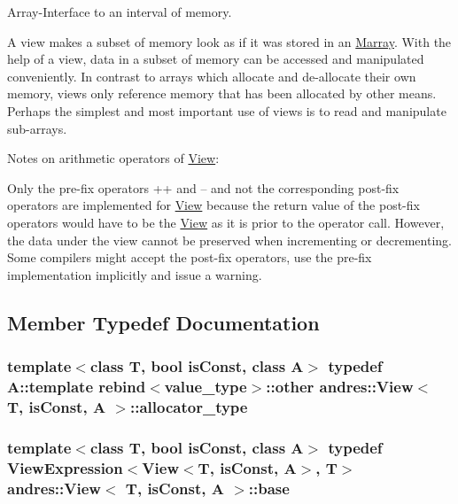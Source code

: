 Array-\/\+Interface to an interval of memory.

A view makes a subset of memory look as if it was stored in an \hyperlink{classandres_1_1Marray}{Marray}. With the help of a view, data in a subset of memory can be accessed and manipulated conveniently. In contrast to arrays which allocate and de-\/allocate their own memory, views only reference memory that has been allocated by other means. Perhaps the simplest and most important use of views is to read and manipulate sub-\/arrays.

Notes on arithmetic operators of \hyperlink{classandres_1_1View}{View}\+:
\begin{DoxyItemize}
\item Only the pre-\/fix operators ++ and -- and not the corresponding post-\/fix operators are implemented for \hyperlink{classandres_1_1View}{View} because the return value of the post-\/fix operators would have to be the \hyperlink{classandres_1_1View}{View} as it is prior to the operator call. However, the data under the view cannot be preserved when incrementing or decrementing. Some compilers might accept the post-\/fix operators, use the pre-\/fix implementation implicitly and issue a warning. 
\end{DoxyItemize}

\subsection{Member Typedef Documentation}
\hypertarget{classandres_1_1View_a175e5862a7133a937e7901e5894c2e10}{}
\subsubsection[{allocator\+\_\+type}]{\setlength{\rightskip}{0pt plus 5cm}template$<$class T, bool is\+Const, class A$>$ typedef A\+::template rebind$<${\bf value\+\_\+type}$>$\+::other {\bf andres\+::\+View}$<$ T, is\+Const, A $>$\+::{\bf allocator\+\_\+type}}\label{classandres_1_1View_a175e5862a7133a937e7901e5894c2e10}
\hypertarget{classandres_1_1View_ac9b2563b59f4fe1d90144bc4be2a2008}{}
\subsubsection[{base}]{\setlength{\rightskip}{0pt plus 5cm}template$<$class T, bool is\+Const, class A$>$ typedef {\bf View\+Expression}$<${\bf View}$<$T, is\+Const, A$>$, T$>$ {\bf andres\+::\+View}$<$ T, is\+Const, A $>$\+::{\bf base}}\label{classandres_1_1View_ac9b2563b59f4fe1d90144bc4be2a2008}
\hypertarget{classandres_1_1View_a7b6f125a7b3830f30cd34887b61858a7}{}
